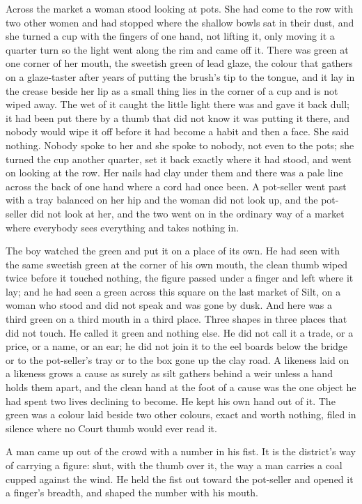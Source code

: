 Across the market a woman stood looking at pots. She had come to the row with two other women and had stopped where the shallow bowls sat in their dust, and she turned a cup with the fingers of one hand, not lifting it, only moving it a quarter turn so the light went along the rim and came off it. There was green at one corner of her mouth, the sweetish green of lead glaze, the colour that gathers on a glaze-taster after years of putting the brush's tip to the tongue, and it lay in the crease beside her lip as a small thing lies in the corner of a cup and is not wiped away. The wet of it caught the little light there was and gave it back dull; it had been put there by a thumb that did not know it was putting it there, and nobody would wipe it off before it had become a habit and then a face. She said nothing. Nobody spoke to her and she spoke to nobody, not even to the pots; she turned the cup another quarter, set it back exactly where it had stood, and went on looking at the row. Her nails had clay under them and there was a pale line across the back of one hand where a cord had once been. A pot-seller went past with a tray balanced on her hip and the woman did not look up, and the pot-seller did not look at her, and the two went on in the ordinary way of a market where everybody sees everything and takes nothing in.

The boy watched the green and put it on a place of its own. He had seen  with the same sweetish green at the corner of his own mouth, the clean thumb wiped twice before it touched nothing, the figure passed under a finger and left where it lay; and he had seen a green across this square on the last market of Silt, on a woman who stood and did not speak and was gone by dusk. And here was a third green on a third mouth in a third place. Three shapes in three places that did not touch. He called it green and nothing else. He did not call it a trade, or a price, or a name, or an ear; he did not join it to the eel boards below the bridge or to the pot-seller's tray or to the box gone up the clay road. A likeness laid on a likeness grows a cause as surely as silt gathers behind a weir unless a hand holds them apart, and the clean hand at the foot of a cause was the one object he had spent two lives declining to become. He kept his own hand out of it. The green was a colour laid beside two other colours, exact and worth nothing, filed in silence where no Court thumb would ever read it.

A man came up out of the crowd with a number in his fist. It is the district's way of carrying a figure: shut, with the thumb over it, the way a man carries a coal cupped against the wind. He held the fist out toward the pot-seller and opened it a finger's breadth, and shaped the number with his mouth.

